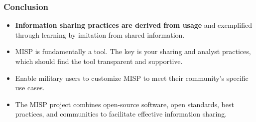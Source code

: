 \begin{frame}
        \frametitle{Conclusion}
        \begin{itemize}
                \item \textbf{Information sharing practices are derived from usage} and exemplified through learning by imitation from shared information.
                \item MISP is fundamentally a tool. The key is your sharing and analyst practices, which should find the tool transparent and supportive.
                \item Enable military users to customize MISP to meet their community's specific use cases.                                                                     
                \item The MISP project combines open-source software, open standards, best practices, and communities to facilitate effective information sharing.
        \end{itemize}
\end{frame}


